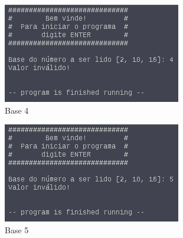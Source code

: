 \documentclass{article}
\begin{document}
\begin{figure}[H]
  \includegraphics[width=\linewidth]{./CasoErro1}
  \caption{Base 4}
  \label{fig:erro1}
\end{figure}

\begin{figure}[H]
  \includegraphics[width=\linewidth]{./CasoErro2}
  \caption{Base 5}
  \label{fig:erro2}
\end{figure}
\end{document}
